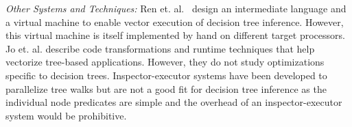 \emph{Other Systems and Techniques:} Ren et. al.~\cite{PortableVM} design an
intermediate language and a virtual machine to enable vector execution of decision tree
inference. However, this virtual machine is itself implemented by 
hand on different target processors.
Jo et. al.\cite{MilindTreeVectorization} describe code transformations and runtime 
techniques that help vectorize tree-based applications. However, they do not 
study optimizations specific to decision trees.
Inspector-executor systems \cite{TaoOfParallelism,HybridCPUGPU} have been 
developed to parallelize tree walks but are not a good fit 
for decision tree inference as the individual node predicates are 
simple and the overhead of an inspector-executor system would be prohibitive.

